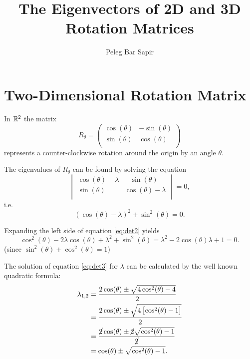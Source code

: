 \documentclass[a4paper]{article}
\title{The Eigenvectors of 2D and 3D Rotation Matrices}
\author{Peleg Bar Sapir}
\begin{document}
\maketitle

\section{Two-Dimensional Rotation Matrix}
In $\mathbb{R}^{2}$ the matrix
\begin{equation}
	R_{\theta} =
		\begin{pmatrix}
			\cos(\theta) & -\sin(\theta)\\
			\sin(\theta) & \cos(\theta)\\
		\end{pmatrix}
	\label{eq:rotmat}
\end{equation}
represents a counter-clockwise rotation around the origin by an angle $\theta$.

The eigenvalues of $R_{\theta}$ can be found by solving the equation
\begin{equation}
	\begin{vmatrix}
		\cos(\theta)-\lambda & -\sin(\theta)\\
		\sin(\theta) & \cos(\theta)-\lambda\\
	\end{vmatrix}=0,
	\label{eq:det1}
\end{equation}
i.e.
\begin{equation}
	\left(\cos(\theta)-\lambda\right)^{2} + \sin^{2}(\theta) = 0.
	\label{eq:det2}
\end{equation}

Expanding the left side of equation \ref{eq:det2} yields
\begin{equation}
	\cos^{2}(\theta) - 2\lambda\cos(\theta) + \lambda^{2} + \sin^{2}(\theta) = \lambda^{2} - 2\cos(\theta)\lambda + 1 = 0.
	\label{eq:det3}
\end{equation}
(since $\sin^{2}(\theta) + \cos^{2}(\theta) = 1$)

The solution of equation \ref{eq:det3} for $\lambda$ can be calculated by the well known quadratic formula:
\begin{align}
	\lambda_{1,2} &= \frac{2\cos(\theta)\pm\sqrt{4\cos^{2}(\theta)-4}}{2}\\
	&= \frac{2\cos(\theta)\pm\sqrt{4\left[ \cos^{2}(\theta)-1 \right]}}{2}\\
	&= \frac{\cancel{2}\cos(\theta)\pm\cancel{2}\sqrt{\cos^{2}(\theta)-1}}{\cancel{2}}\\
	&= \cos(\theta) \pm \sqrt{\cos^{2}(\theta)-1}.
	\label{eq:quadratic}
\end{align}
\end{document}
